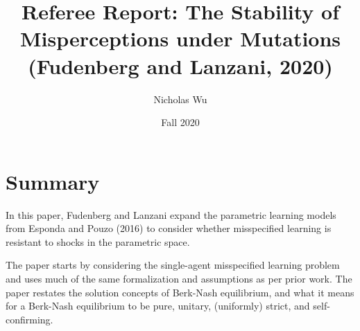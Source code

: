 \documentclass[10pt,letter]{article}
\begin{document}


\title{Referee Report: The Stability of Misperceptions under Mutations (Fudenberg and Lanzani, 2020)}


\author{Nicholas Wu}

\date{Fall 2020}

\maketitle

\section*{Summary}

In this paper, Fudenberg and Lanzani expand the parametric learning models from Esponda and Pouzo (2016) to consider whether misspecified learning is resistant to shocks in the parametric space.

The paper starts by considering the single-agent misspecified learning problem and uses much of the same formalization and assumptions as per prior work. The paper restates the solution concepts of Berk-Nash equilibrium, and what it means for a Berk-Nash equilibrium to be pure, unitary, (uniformly) strict, and self-confirming.
\end{document}
